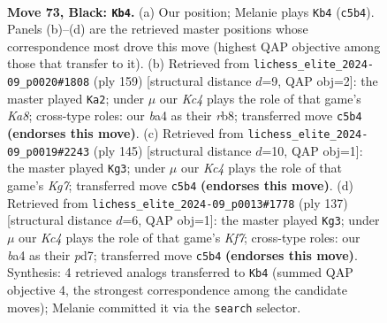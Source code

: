 \documentclass[11pt]{article}
\begin{document}
\clearpage

\begin{figure}[p]\centering
\begin{subfigure}{0.46\textwidth}\centering
\resizebox{\linewidth}{!}{%
\newchessgame
\chessboard[
  setfen={8/5P1R/8/2k5/B7/8/5K1P/8 b - - 0 73},
  showmover=false,
  pgfstyle=straightmove, color=movearrow, markmove={c5-b4}
]}
\caption{}
\end{subfigure}\hfill
\begin{subfigure}{0.46\textwidth}\centering
\resizebox{\linewidth}{!}{%
\newchessgame
\chessboard[
  setfen={1R6/6P1/8/6R1/8/7K/8/k7 b - - 2 80},
  showmover=false,
  pgfstyle=straightmove, color=movearrow, markmove={a1-a2}
]}
\caption{}
\end{subfigure}
\\[4pt]
\begin{subfigure}{0.46\textwidth}\centering
\resizebox{\linewidth}{!}{%
\newchessgame
\chessboard[
  setfen={5R2/8/5P2/6K1/8/8/6k1/8 b - - 0 73},
  showmover=false,
  pgfstyle=straightmove, color=movearrow, markmove={g2-g3}
]}
\caption{}
\end{subfigure}\hfill
\begin{subfigure}{0.46\textwidth}\centering
\resizebox{\linewidth}{!}{%
\newchessgame
\chessboard[
  setfen={8/3P4/8/2R2P2/4K3/8/5k2/8 b - - 0 69},
  showmover=false,
  pgfstyle=straightmove, color=movearrow, markmove={f2-g3}
]}
\caption{}
\end{subfigure}
\caption{\textbf{Move 73, Black: \texttt{Kb4}.} (a) Our position; Melanie plays \texttt{Kb4} (\texttt{c5b4}). Panels (b)--(d) are the retrieved master positions whose correspondence most drove this move (highest QAP objective among those that transfer to it). (b) Retrieved from \texttt{lichess\_elite\_2024-09\_p0020\#1808} (ply 159) [structural distance $d$=9, QAP obj=2]: the master played \texttt{Ka2}; under $\mu$ our \emph{Kc4} plays the role of that game's \emph{Ka8}; cross-type roles: our \emph{b}a4 as their \emph{r}b8; transferred move \texttt{c5b4} \textbf{(endorses this move)}. (c) Retrieved from \texttt{lichess\_elite\_2024-09\_p0019\#2243} (ply 145) [structural distance $d$=10, QAP obj=1]: the master played \texttt{Kg3}; under $\mu$ our \emph{Kc4} plays the role of that game's \emph{Kg7}; transferred move \texttt{c5b4} \textbf{(endorses this move)}. (d) Retrieved from \texttt{lichess\_elite\_2024-09\_p0013\#1778} (ply 137) [structural distance $d$=6, QAP obj=1]: the master played \texttt{Kg3}; under $\mu$ our \emph{Kc4} plays the role of that game's \emph{Kf7}; cross-type roles: our \emph{b}a4 as their \emph{p}d7; transferred move \texttt{c5b4} \textbf{(endorses this move)}. Synthesis: 4 retrieved analogs transferred to \texttt{Kb4} (summed QAP objective 4, the strongest correspondence among the candidate moves); Melanie committed it via the \texttt{search} selector.}
\label{fig:thought-m145}
\end{figure}
\end{document}
